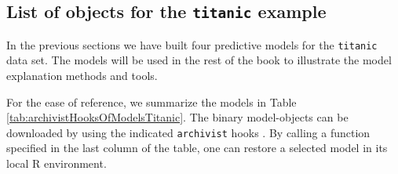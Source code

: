 \documentclass[]{krantz}
\begin{document}
\hypertarget{ListOfModelsTitanic}{%
\subsection{\texorpdfstring{List of objects for the \texttt{titanic} example}{List of objects for the titanic example}}\label{ListOfModelsTitanic}}

In the previous sections we have built four predictive models for the \texttt{titanic} data set. The models will be used in the rest of the book to illustrate the model explanation methods and tools.

For the ease of reference, we summarize the models in Table \ref{tab:archivistHooksOfModelsTitanic}. The binary model-objects can be downloaded by using the indicated \texttt{archivist} hooks \citep{archivist}. By calling a function specified in the last column of the table, one can restore a selected model in its local R environment.
\end{document}
